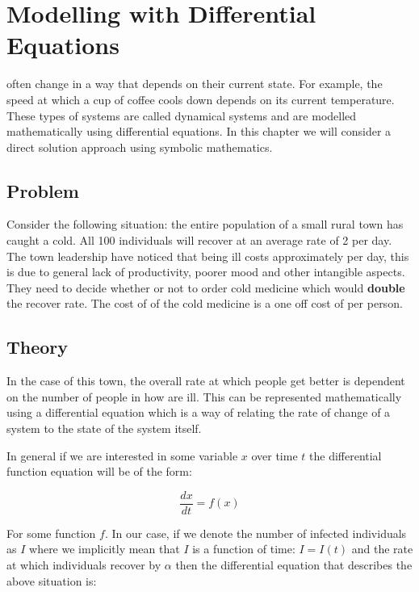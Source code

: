 \chapter[Modelling with Differential Equations]{Modelling with Differential Equations}

 often change in a way that depends on their current
state. For example, the speed at which a cup of coffee cools down depends on its
current temperature. These types of systems are called dynamical systems and are
modelled mathematically using differential equations. In this chapter we will
consider a direct solution approach using symbolic mathematics.

\section{Problem}\label{sec:problem}

Consider the following situation: the entire population of a small rural town
has caught a cold. All 100 individuals will recover at an average rate of 2 per
day.  The town leadership have noticed that being ill costs approximately
 per day, this is due to general lack of productivity, poorer mood and
other intangible aspects. They need to decide whether or not to order cold
medicine which would \textbf{double} the recover rate. The cost of of the cold
medicine is a one off cost of  per person. 

\section{Theory}\label{sec:theory}

In the case of this town, the overall rate at which people get better is
dependent on the number of people in how are ill. This can be represented
mathematically using a differential equation which is a way of relating the rate
of change of a system to the state of the system itself.

In general if we are interested in some variable \(x\) over time \(t\) the
differential function equation will be of the form:

\begin{equation}
    \frac{dx}{dt} = f(x)
\end{equation}

For some function \(f\).
In our case,
if we denote the number of infected individuals as \(I\) where we implicitly
mean that \(I\) is a function of time: \(I=I(t)\) and the rate at which
individuals recover by \(\alpha\) then the differential equation
that describes the above situation is:

